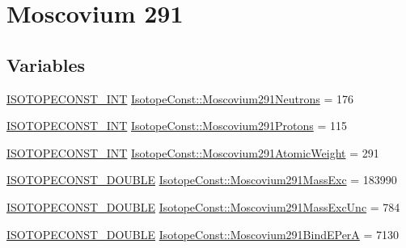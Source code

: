 \hypertarget{group___isotope_const-_moscovium-_mc291}{}\section{Moscovium 291}
\label{group___isotope_const-_moscovium-_mc291}
\subsection*{Variables}
\begin{DoxyCompactItemize}
\item 
\mbox{\hyperlink{group___isotope_const-_macros_ga5f18360b3e99483a35c32d789e62621c}{I\+S\+O\+T\+O\+P\+E\+C\+O\+N\+S\+T\+\_\+\+I\+NT}} \mbox{\hyperlink{group___isotope_const-_moscovium-_mc291_ga5e536e7d088bb085023f94c952123bcd}{Isotope\+Const\+::\+Moscovium291\+Neutrons}} = 176
\item 
\mbox{\hyperlink{group___isotope_const-_macros_ga5f18360b3e99483a35c32d789e62621c}{I\+S\+O\+T\+O\+P\+E\+C\+O\+N\+S\+T\+\_\+\+I\+NT}} \mbox{\hyperlink{group___isotope_const-_moscovium-_mc291_ga84873c1a166b717c9ab5cf3674e5f7ec}{Isotope\+Const\+::\+Moscovium291\+Protons}} = 115
\item 
\mbox{\hyperlink{group___isotope_const-_macros_ga5f18360b3e99483a35c32d789e62621c}{I\+S\+O\+T\+O\+P\+E\+C\+O\+N\+S\+T\+\_\+\+I\+NT}} \mbox{\hyperlink{group___isotope_const-_moscovium-_mc291_ga2cac54a4bbcd1e379fab544dc83bf0a1}{Isotope\+Const\+::\+Moscovium291\+Atomic\+Weight}} = 291
\item 
\mbox{\hyperlink{group___isotope_const-_macros_ga8f45a7272ce02c0b4c65c44636ed719a}{I\+S\+O\+T\+O\+P\+E\+C\+O\+N\+S\+T\+\_\+\+D\+O\+U\+B\+LE}} \mbox{\hyperlink{group___isotope_const-_moscovium-_mc291_ga5de9e2df6278844fd7f9e5b5e7cfc997}{Isotope\+Const\+::\+Moscovium291\+Mass\+Exc}} = 183990
\item 
\mbox{\hyperlink{group___isotope_const-_macros_ga8f45a7272ce02c0b4c65c44636ed719a}{I\+S\+O\+T\+O\+P\+E\+C\+O\+N\+S\+T\+\_\+\+D\+O\+U\+B\+LE}} \mbox{\hyperlink{group___isotope_const-_moscovium-_mc291_ga3d97a3c2f9f0782c5a9455246d57619f}{Isotope\+Const\+::\+Moscovium291\+Mass\+Exc\+Unc}} = 784
\item 
\mbox{\hyperlink{group___isotope_const-_macros_ga8f45a7272ce02c0b4c65c44636ed719a}{I\+S\+O\+T\+O\+P\+E\+C\+O\+N\+S\+T\+\_\+\+D\+O\+U\+B\+LE}} \mbox{\hyperlink{group___isotope_const-_moscovium-_mc291_ga203a6e7920db3041350980a13238ac6b}{Isotope\+Const\+::\+Moscovium291\+Bind\+E\+PerA}} = 7130
\item 

\end{DoxyCompactItemize}
